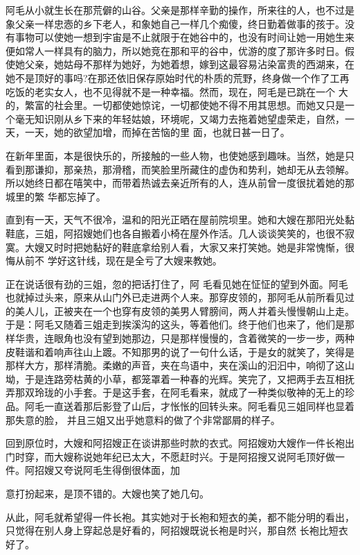\documentclass{article}
\begin{document}
阿毛从小就生长在那荒僻的山谷。父亲是那样辛勤的操作，所来往的人，也不过是象父亲一样忠悫的乡下老人，和象她自己一样几个痴傻，终日勤着做事的孩于。没有事物可以使她一想到宇宙是不止就限于在她谷中的，也没有时间让她一用她生来便如常人一样具有的脑力，所以她竞在那和平的谷中，优游的度了那许多时日。假使她父亲，她姑母不那样为她好，为她着想，嫁到这最容易沾染富贵的西湖来，在她不是顶好的事吗?在那还依旧保存原始时代的朴质的荒野，终身做一个作了工再吃饭的老实女人，也不见得就不是一种幸福。然而，现在，阿毛是已跳在一个
\newpage
大的，繁富的社会里。一切都使她惊诧，一切都使她不得不用其思想。而她又只是一个毫无知识刚从乡下来的年轻姑娘，环境呢，又竭力去拖着她望虚荣走，自然，一天，一天，她的欲望加增，而掉在苦恼的里
面，也就日甚一日了。 

在新年里面，本是很快乐的，所接触的一些人物，也使她感到趣味。当然，她是只看到那谦抑，那亲热，那滑稽，而笑脸里所藏住的虚伪和势利，她却无从去领解。所以她终日都在嘻笑中，而带着热诚去亲近所有的人，连从前曾一度很扰着她的那城里的繁
华都忘掉了。 

直到有一天，天气不很冷，温和的阳光正晒在屋前院坝里。她和大嫂在那阳光处黏鞋底，三姐，阿招嫂她们也各自搬着小椅在屋外作活。几人谈谈笑笑的，也很不寂寞。大嫂又时时把她黏好的鞋底拿给别人看，大家又来打笑她。她是非常愧惭，很悔从前不
学好这针线，现在是全亏了大嫂来教她。 

正在说话很有劲的三姐，忽的把话打住了，阿
\newpage
毛看见她在怔怔的望到外面。阿毛也就掉过头来，原来从山门外已走进两个人来。那穿皮领的，那阿毛从前所看见过的美人儿，正被夹在一个也穿有皮领的美男人臂膀间，两人并着头慢慢朝山上走。于是：阿毛又随着三姐走到挨溪沟的这头，等着他们。终于他们也来了，他们是那样华贵，连眼角也没有望到她那边，只是那样慢慢的，含着微笑的一步一步，两种皮鞋谐和着响声往山上踱。不知那男的说了一句什么话，于是女的就笑了，笑得是那样大方，那样清脆。柔嫩的声音，夹在鸟语中，夹在溪山的汩汩中，响彻了这山坳，于是连路旁枯黄的小草，都笼罩着一种春的光辉。笑完了，又把两手去互相抚弄那双玲珑的小手套。于是这手套，在阿毛看来，就成了一种类似敬神的无上的珍品。阿毛一直送着那后影登了山后，才怅怅的回转头来。阿毛看见三姐同样也显着那失意的脸，
并且三姐又出乎她意料的做了个非常鄙屑的样子。 

回到原位时，大嫂和阿招嫂正在谈讲那些时款的衣式。阿招嫂劝大嫂作一件长袍出门时穿，而大嫂称说她年纪已太大，不愿赶时兴。于是阿招搜又说阿毛顶好做一件。阿招嫂又夸说阿毛生得倒很体面，加
\newpage

意打扮起来，是顶不错的。大嫂也笑了她几句。 

从此，阿毛就希望得一件长袍。其实她对于长袍和短衣的美，都不能分明的看出，只觉得在别人身上穿起总是好看的，阿招嫂既说长袍是时兴，那自然
长袍比短衣好了。 
\end{document}
